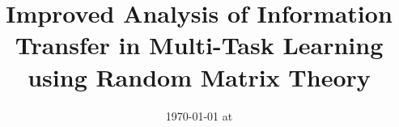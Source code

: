 \documentclass{article}
\begin{document}
\title{Improved Analysis of Information Transfer in Multi-Task Learning using Random Matrix Theory}
\date{}
\maketitle
\date{{\ddmmyyyydate\today} at \currenttime}




\end{document}
